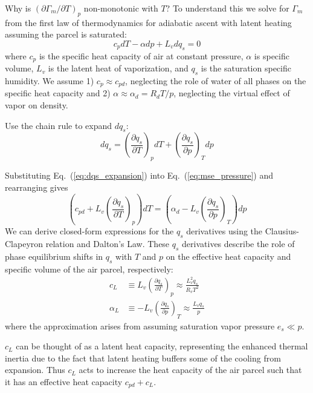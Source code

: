 \documentclass[draft]{ametsocV6.1}
\begin{document}
Why is $(\partial\Gamma_m/\partial T)_p$ non-monotonic with $T$? To understand this we solve for $\Gamma_m$ from the first law of thermodynamics for adiabatic ascent with latent heating assuming the parcel is saturated:
\begin{equation}
c_{p} dT - \alpha dp + L_v dq_s = 0 \label{eq:mse_pressure}
\end{equation}
where $c_{p}$ is the specific heat capacity of air at constant pressure, $\alpha$ is specific volume, $L_v$ is the latent heat of vaporization, and $q_s$ is the saturation specific humidity. We assume 1) $c_p \approx c_{pd}$, neglecting the role of water of all phases on the specific heat capacity and 2) $\alpha \approx \alpha_d = R_d T/p$, neglecting the virtual effect of vapor on density. 

Use the chain rule to expand $dq_s$:
\begin{equation}
dq_s = \left(\frac{\partial q_s}{\partial T}\right)_p dT + \left(\frac{\partial q_s}{\partial p}\right)_T dp \label{eq:dqs_expansion}
\end{equation}

Substituting Eq.~(\ref{eq:dqs_expansion}) into Eq.~(\ref{eq:mse_pressure}) and rearranging gives
\begin{equation}
\left(c_{pd} + L_v\left(\frac{\partial q_s}{\partial T}\right)_p \right)dT = \left(\alpha_d - L_v\left(\frac{\partial q_s}{\partial p}\right)_T\right)dp \label{eq:rearranged}
\end{equation}
We can derive closed-form expressions for the $q_s$ derivatives using the Clausius-Clapeyron relation and Dalton's Law. These $q_s$ derivatives describe the role of phase equilibrium shifts in $q_s$ with $T$ and $p$ on the effective heat capacity and specific volume of the air parcel, respectively:
\begin{align}
c_L &\equiv L_v\left(\frac{\partial q_s}{\partial T}\right)_p \approx \frac{L_v^2 q_s}{R_v T^2}
\label{eq:c_L} \\
\alpha_L &\equiv -L_v\left(\frac{\partial q_s}{\partial p}\right)_T \approx \frac{L_v q_s}{p}
\label{eq:alpha_L}
\end{align}
where the approximation arises from assuming saturation vapor pressure $e_s \ll p$.

$c_L$ can be thought of as a latent heat capacity, representing the enhanced thermal inertia due to the fact that latent heating buffers some of the cooling from expansion. Thus $c_L$ acts to increase the heat capacity of the air parcel such that it has an effective heat capacity $c_{pd} + c_L$.
\end{document}
